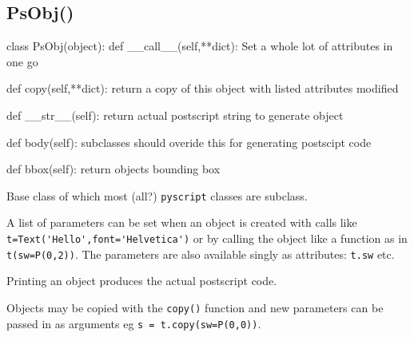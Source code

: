 \documentclass[a4paper]{book}
\begin{document}
\subsection{PsObj()}
\label{sec:psobj}
\begin{python}
class PsObj(object):
    def __call__(self,**dict):
        Set a whole lot of attributes in one go

    def copy(self,**dict):
        return a copy of this object
        with listed attributes modified

    def __str__(self):
        return actual postscript string to generate object

    def body(self):
        subclasses should overide this for generating postscipt code

    def bbox(self):
        return objects bounding box
\end{python}

Base class of which most (all?) \Verb|pyscript| classes are subclass.

A list of parameters can be set when an object is created with
calls like \Verb|t=Text('Hello',font='Helvetica')|
or by calling the object like a function as in \Verb|t(sw=P(0,2))|.
The parameters are also available singly as attributes: \Verb|t.sw| etc.

Printing an object produces the actual postscript code.

Objects may be copied with the \Verb|copy()| function and new
parameters can be passed in as arguments eg \Verb|s = t.copy(sw=P(0,0))|.

\end{document}
